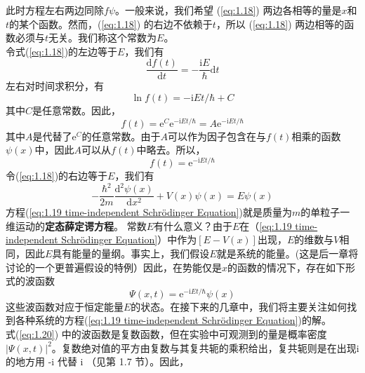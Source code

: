 	此时方程左右两边同除$f\psi$。一般来说，我们希望 (\ref{eq:1.18}) 两边各相等的量是$x$和$t$的某个函数。然而，(\ref{eq:1.18}) 的右边不依赖于$t$，所以 (\ref{eq:1.18}) 两边相等的函数必须与$t$无关。我们称这个常数为$E$。\\
	\indent 令式(\ref{eq:1.18})的左边等于$E$，我们有
	\begin{equation*}
		\frac{\mathrm{d}f\left(t\right)}{\mathrm{d}t}=-\frac{\mathrm{i}E}{\hbar}\mathrm{d}t
	\end{equation*}
	左右对时间求积分，有
	\begin{equation*}
		\ln f\left(t\right)= - \mathrm{i}Et/\hbar+C
	\end{equation*}
	其中$C$是任意常数。因此，
	\begin{equation*}
		f\left(t\right)=\mathrm{e}^C\mathrm{e}^{-\mathrm{i}Et/\hbar}=A\mathrm{e}^{-\mathrm{i}Et/\hbar}
	\end{equation*}
	其中$A$是代替了$\mathrm{e}^C$的任意常数。由于$A$可以作为因子包含在与$f\left(t\right)$相乘的函数$\psi\left(x\right)$中，因此$A$可以从$f\left(t\right)$中略去。所以，
	\begin{equation*}
		f\left(t\right)=\mathrm{e}^{-\mathrm{i}Et/\hbar}
	\end{equation*}
	\indent 令(\ref{eq:1.18})的右边等于$E$，我们有
	\begin{equation}
		\boxed{-\frac{\hbar^2}{2m}\frac{\mathrm{d}^2\psi\left(x\right)}{\mathrm{d}x^2}+V\left(x\right)\psi\left(x\right)=E\psi\left(x\right)}
		\label{eq:1.19 time-independent Schrödinger Equation}
	\end{equation}
	方程(\ref{eq:1.19 time-independent Schrödinger Equation})就是质量为$m$的单粒子一维运动的\textbf{定态薛定谔方程}。	常数$E$有什么意义？由于$E$在（\ref{eq:1.19 time-independent Schrödinger Equation}）中作为$\left[E-V\left(x\right)\right]$出现，$E$的维数与$V$相同，因此$E$具有能量的量纲。事实上，我们假设$E$就是系统的能量。(这是后一章将讨论的一个更普遍假设的特例）因此，在势能仅是$x$的函数的情况下，存在如下形式的波函数
	\begin{equation}
		\Psi\left(x,t\right)=\mathrm{e}^{-\mathrm{i}Et/\hbar}\psi\left(x\right)
		\label{eq:1.20}
	\end{equation}
	这些波函数对应于恒定能量$E$的状态。在接下来的几章中，我们将主要关注如何找到各种系统的方程(\ref{eq:1.19 time-independent Schrödinger Equation})的解。\\
	\indent 式(\ref{eq:1.20}) 中的波函数是复数函数，但在实验中可观测到的量是概率密度$\left|\Psi\left(x,t\right)\right|^2$。复数绝对值的平方由复数与其复共轭的乘积给出，复共轭则是在出现i的地方用 -i 代替 i （见第 1.7 节）。因此，

